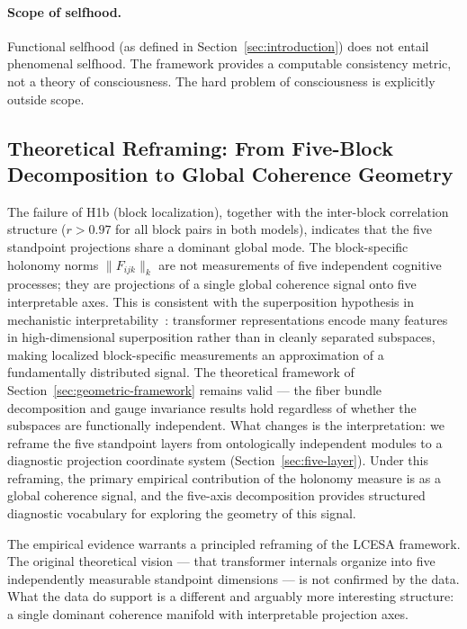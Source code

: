 \paragraph{Scope of selfhood.}
Functional selfhood (as defined in Section~\ref{sec:introduction}) does not entail
phenomenal selfhood. The framework provides a computable consistency metric, not a
theory of consciousness. The hard problem of consciousness is explicitly outside scope.

\subsection{Theoretical Reframing: From Five-Block Decomposition to Global Coherence Geometry}
\label{sec:reframing}

The failure of H1b (block localization), together with the inter-block correlation
structure ($r > 0.97$ for all block pairs in both models), indicates that the five
standpoint projections share a dominant global mode. The block-specific holonomy norms
$\|F_{ijk}\|_k$ are not measurements of five independent cognitive processes; they are
projections of a single global coherence signal onto five interpretable axes. This is
consistent with the superposition hypothesis in mechanistic
interpretability~\cite{elhage2022superposition}: transformer representations encode many
features in high-dimensional superposition rather than in cleanly separated subspaces,
making localized block-specific measurements an approximation of a fundamentally
distributed signal. The theoretical framework of Section~\ref{sec:geometric-framework}
remains valid --- the fiber bundle decomposition and gauge invariance results hold
regardless of whether the subspaces are functionally independent. What changes is the
interpretation: we reframe the five standpoint layers from ontologically independent
modules to a diagnostic projection coordinate system
(Section~\ref{sec:five-layer}). Under this reframing, the primary empirical contribution
of the holonomy measure is as a global coherence signal, and the five-axis decomposition
provides structured diagnostic vocabulary for exploring the geometry of this signal.

The empirical evidence warrants a principled reframing of the LCESA framework. The
original theoretical vision --- that transformer internals organize into five
independently measurable standpoint dimensions --- is not confirmed by the data. What the
data do support is a different and arguably more interesting structure: a single dominant
coherence manifold with interpretable projection axes.

